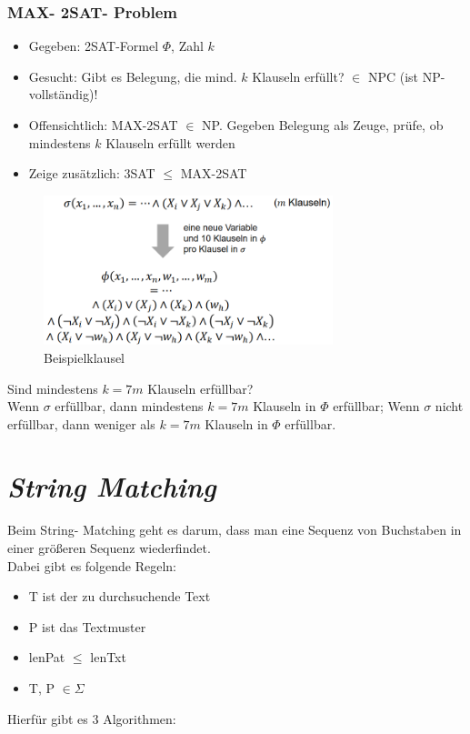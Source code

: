 \documentclass{article}
\begin{document}
            \subsubsection{MAX- 2SAT- Problem}
                \begin{itemize}
                    \item Gegeben: 2SAT-Formel $\Phi$, Zahl $k$
                    \item Gesucht: Gibt es Belegung, die mind. $k$ Klauseln erfüllt? $\in$ NPC (ist NP-vollständig)!
                    \item Offensichtlich: MAX-2SAT $\in$ NP. Gegeben Belegung als Zeuge, prüfe, ob mindestens $k$ Klauseln erfüllt werden
                    \item Zeige zusätzlich: 3SAT $\leq$ MAX-2SAT
                \end{itemize}
                \begin{figure}[ht]
                    \centering
                    \includegraphics[width=0.75\textwidth]{Bilder/MAX2SAT.png}
                    \caption{Beispielklausel}
                    \label{fig:MAX2SAT}
                \end{figure}
                \newpage
                Sind mindestens $k = 7m$ Klauseln erfüllbar?\\
                Wenn $\sigma$ erfüllbar, dann mindestens $k=7m$ Klauseln in $\Phi$ erfüllbar;
                Wenn $\sigma$ nicht erfüllbar, dann weniger als $k=7m$ Klauseln in $\Phi$ erfüllbar.


    \newpage
    \section{\textit{String Matching}}
    Beim String- Matching geht es darum, dass man eine Sequenz von Buchstaben in einer größeren Sequenz wiederfindet.\\
    Dabei gibt es folgende Regeln:
    \begin{itemize}
        \item T ist der zu durchsuchende Text 
        \item P ist das Textmuster
        \item lenPat $\leq$ lenTxt 
        \item T, P $\in \Sigma$
    \end{itemize}
    Hierfür gibt es 3 Algorithmen:
\end{document}

